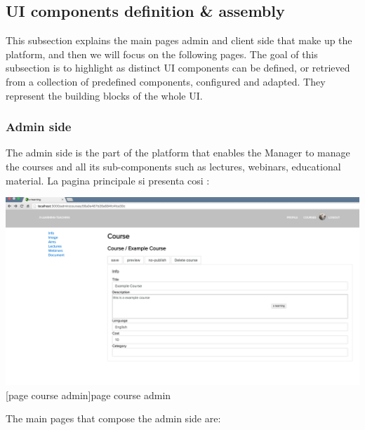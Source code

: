 \subsection {UI components definition & assembly}
\label{subsec:components_definition}
This subsection explains the main pages admin and client side that make up the platform, and then we will focus on the following pages.
The goal of this subsection is to highlight as distinct UI components can be defined, or retrieved from a collection of predefined components, configured and adapted. They represent the building blocks of the whole UI.


\subsubsection {Admin side}
\label{subsec:Admin_side}
The admin side is the part of the platform that enables the Manager to manage the courses and all its sub-components such as lectures, webinars, educational material.
La pagina principale si presenta cosi :

\begin{minipage}{\linewidth}
    \centering
    \includegraphics[width=1.0\linewidth]{images/chapter4/page-course-admin.png}
    [page course admin]{page course admin}
\end{minipage}


The main pages that compose the admin side are:

